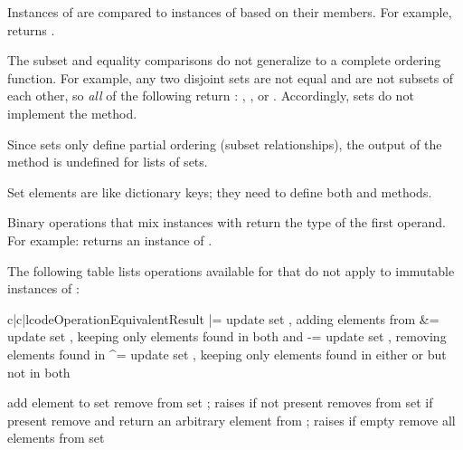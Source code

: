 Instances of  are compared to instances of  based
on their members.  For example,  returns
.     

The subset and equality comparisons do not generalize to a complete
ordering function.  For example, any two disjoint sets are not equal and
are not subsets of each other, so \emph{all} of the following return
:  , , or
.
Accordingly, sets do not implement the  method.

Since sets only define partial ordering (subset relationships), the output
of the  method is undefined for lists of sets.

Set elements are like dictionary keys; they need to define both
 and  methods.

Binary operations that mix  instances with 
return the type of the first operand.  For example:
 returns an instance of .

The following table lists operations available for 
that do not apply to immutable instances of :

\begin{tableiii}{c|c|l}{code}{Operation}{Equivalent}{Result}
         { |= }
         {update set , adding elements from }
         { \&= }
         {update set , keeping only elements found in both  and }
         { -= }
         {update set , removing elements found in }
         { \textasciicircum= }
         {update set , keeping only elements found in either  or 
          but not in both}

  \hline
         {add element  to set }
         {remove  from set ; raises 
	  if not present}
         {removes  from set  if present}
         {remove and return an arbitrary element from ; raises
	   if empty}
         {remove all elements from set }
\end{tableiii}

